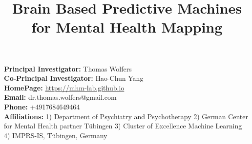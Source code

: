 \documentclass[10pt]{article}
\title{Brain Based Predictive Machines for Mental Health Mapping}
\author{}
\date{\vspace{-6em}}
\begin{document}
\maketitle
\noindent
\textbf{Principal Investigator:} Thomas Wolfers \\
\textbf{Co-Principal Investigator:} Hao-Chun Yang \\
\textbf{HomePage:} \url{https://mhm-lab.github.io} \\
\textbf{Email:} dr.thomas.wolfers@gmail.com \\
\textbf{Phone:} +4917684649464 \\
\textbf{Affiliations:} 1) Department of Psychiatry and Psychotherapy 2) German Center for Mental Health partner Tübingen 3) Cluster of Excellence Machine Learning 4) IMPRS-IS, Tübingen, Germany







\begingroup
\setlength{\bibsep}{0.2\baselineskip}
\endgroup
\end{document}
